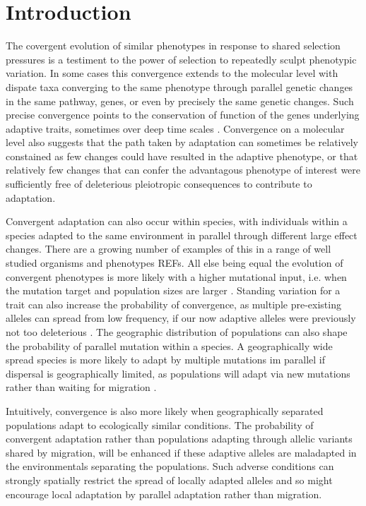 \documentclass{article}
\begin{document}
\section{Introduction}

The covergent evolution of similar phenotypes in response to shared
selection pressures is a testiment to the power of selection to
repeatedly sculpt phenotypic variation. 
In some cases this convergence extends to the molecular level with
dispate taxa converging to the same phenotype through parallel genetic
changes in the same pathway, genes, 
or even by precisely the same genetic changes. Such precise
convergence points to the conservation of function of the genes
underlying adaptive traits, 
sometimes over deep time scales \citep{deephomologypapers}. Convergence on a molecular level also suggests that the path taken by adaptation can sometimes be relatively constained as few changes could have resulted in the adaptive phenotype, or that relatively few changes that can confer the advantagous phenotype of interest were sufficiently free of deleterious pleiotropic consequences to contribute to adaptation. 


Convergent adaptation can also occur within species, with individuals within a species 
adapted to the same environment in parallel through different large effect changes. 
There are a growing number of examples of this in a range of well studied organisms and phenotypes REFs.
All else being equal the evolution of convergent phenotypes is more
likely with a 
higher mutational input, i.e. when the mutation target and population sizes are larger \citep{}. 
Standing variation for a trait can also increase the probability of convergence, 
as multiple pre-existing alleles can spread from low frequency, 
if our now adaptive alleles were previously not too deleterious \citep{Orr,Hermission}. 
The geographic distribution of populations can also shape the probability of parallel mutation within a species.
A geographically wide spread species is more likely to adapt by multiple mutations im parallel if dispersal 
is geographically limited, as populations will adapt via new mutations rather than waiting for migration \citep{RalphCoop}. 


Intuitively, convergence is also more likely when geographically
separated populations adapt to ecologically similar conditions. The
probability of convergent adaptation rather than populations adapting
through allelic variants shared by migration, will be enhanced if
these adaptive alleles are maladapted in the environmentals separating
the populations. Such adverse conditions can strongly spatially restrict the spread of locally adapted alleles \citep{slatkin} 
and so might encourage local adaptation by parallel adaptation rather than migration.\\
 
\end{document}
